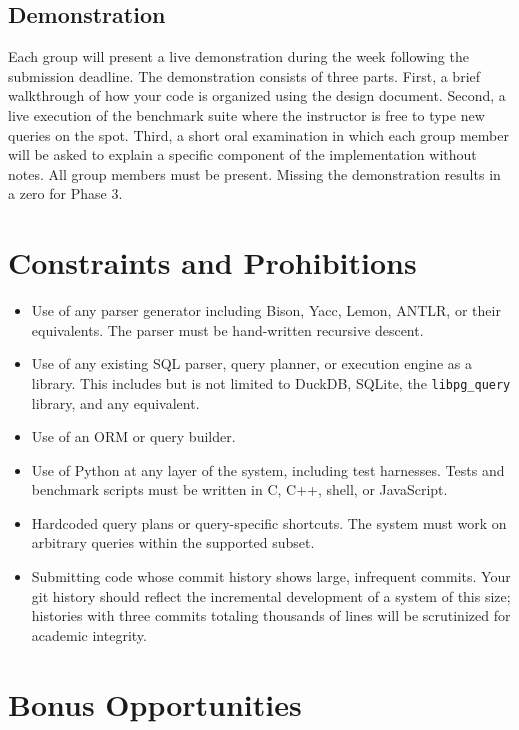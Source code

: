 \documentclass[11pt,a4paper]{article}
\begin{document}
\subsection{Demonstration}
Each group will present a live demonstration during the week following the submission deadline. The demonstration consists of three parts. First, a brief walkthrough of how your code is organized using the design document. Second, a live execution of the benchmark suite where the instructor is free to type new queries on the spot. Third, a short oral examination in which each group member will be asked to explain a specific component of the implementation without notes. All group members must be present. Missing the demonstration results in a zero for Phase 3.

\section{Constraints and Prohibitions}

\begin{notebox}
\begin{itemize}
\item Use of any parser generator including Bison, Yacc, Lemon, ANTLR, or their equivalents. The parser must be hand-written recursive descent.
\item Use of any existing SQL parser, query planner, or execution engine as a library. This includes but is not limited to DuckDB, SQLite, the \texttt{libpg\_query} library, and any equivalent.
\item Use of an ORM or query builder.
\item Use of Python at any layer of the system, including test harnesses. Tests and benchmark scripts must be written in C, C++, shell, or JavaScript.
\item Hardcoded query plans or query-specific shortcuts. The system must work on arbitrary queries within the supported subset.
\item Submitting code whose commit history shows large, infrequent commits. Your git history should reflect the incremental development of a system of this size; histories with three commits totaling thousands of lines will be scrutinized for academic integrity.
\end{itemize}
\end{notebox}

\section{Bonus Opportunities}
\end{document}
